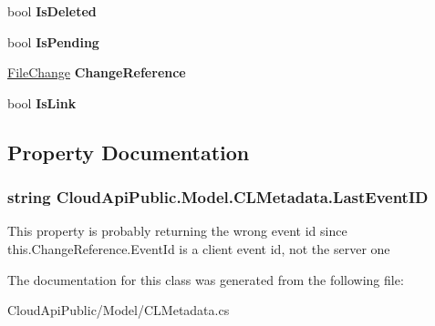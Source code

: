 \begin{DoxyCompactItemize}
\item 
\hypertarget{class_cloud_api_public_1_1_model_1_1_c_l_metadata_af4484ad36f28efe33bf6554b5e5196ba}{bool {\bfseries Is\-Deleted}}\label{class_cloud_api_public_1_1_model_1_1_c_l_metadata_af4484ad36f28efe33bf6554b5e5196ba}

\item 
\hypertarget{class_cloud_api_public_1_1_model_1_1_c_l_metadata_a3d43b7d9b16cbe9495dbbbaea4822852}{bool {\bfseries Is\-Pending}}\label{class_cloud_api_public_1_1_model_1_1_c_l_metadata_a3d43b7d9b16cbe9495dbbbaea4822852}

\item 
\hypertarget{class_cloud_api_public_1_1_model_1_1_c_l_metadata_af4d7cf3d9f8f5fadcbd3ba0b8805a249}{\hyperlink{class_cloud_api_public_1_1_model_1_1_file_change}{File\-Change} {\bfseries Change\-Reference}}\label{class_cloud_api_public_1_1_model_1_1_c_l_metadata_af4d7cf3d9f8f5fadcbd3ba0b8805a249}

\item 
\hypertarget{class_cloud_api_public_1_1_model_1_1_c_l_metadata_a3f45cdefc02b79d81ccdfbb77272262c}{bool {\bfseries Is\-Link}}\label{class_cloud_api_public_1_1_model_1_1_c_l_metadata_a3f45cdefc02b79d81ccdfbb77272262c}

\end{DoxyCompactItemize}


\subsection{Property Documentation}
\hypertarget{class_cloud_api_public_1_1_model_1_1_c_l_metadata_a745145082b6a672987eb4ca888890cd3}{
\subsubsection[{Last\-Event\-I\-D}]{\setlength{\rightskip}{0pt plus 5cm}string Cloud\-Api\-Public.\-Model.\-C\-L\-Metadata.\-Last\-Event\-I\-D\hspace{0.3cm}{\ttfamily [get]}}}\label{class_cloud_api_public_1_1_model_1_1_c_l_metadata_a745145082b6a672987eb4ca888890cd3}


This property is probably returning the wrong event id since this.\-Change\-Reference.\-Event\-Id is a client event id, not the server one 



The documentation for this class was generated from the following file\-:\begin{DoxyCompactItemize}
\item 
Cloud\-Api\-Public/\-Model/C\-L\-Metadata.\-cs\end{DoxyCompactItemize}
